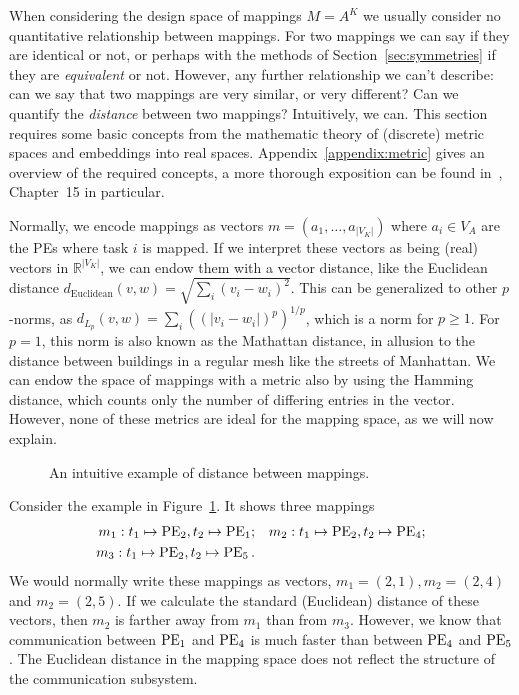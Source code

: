 When considering the design space of mappings $M = A^K$ we usually consider no quantitative relationship between mappings.
For two mappings we can say if they are identical or not, or perhaps with the methods of Section~\ref{sec:symmetries} if they are \emph{equivalent} or not.
However, any further relationship we can't describe: can we say that two mappings are very similar, or very different?
Can we quantify the \emph{distance} between two mappings?
Intuitively, we can.
This section requires some basic concepts from the mathematic theory of (discrete) metric spaces and embeddings into real spaces.
Appendix~\ref{appendix:metric} gives an overview of the required concepts, a more thorough exposition can be found in~\cite{matouvsek}, Chapter~15 in particular.

Normally, we encode mappings as vectors $m = \left( a_1, \ldots, a_{|V_K|} \right)$ where $a_i \in V_A$ are the \acp{PE} where task $i$ is mapped.
If we interpret these vectors as being (real) vectors in $\mathbb{R}^{|V_K|}$, we can endow them with a vector distance, like the Euclidean distance $d_\text{Euclidean}(v,w) = \sqrt{\sum_i (v_i - w_i)^2}$.
This can be generalized to other $p$-norms, as $d_{L_p}(v,w) = \sum_i ((|v_i-w_i|)^p)^{1/p}$, which is a norm for $p \geq 1$.
For $p = 1$, this norm is also known as the Mathattan distance, in allusion to the distance between buildings in a regular mesh like the streets of Manhattan.
We can endow the space of mappings with a metric also by using the Hamming distance, which counts only the number of differing entries in the vector.
However, none of these metrics are ideal for the mapping space, as we will now explain.

\begin{figure}[h]
	\centering
   \resizebox{0.85\textwidth}{!}{
	   \begin{tikzpicture}
	   
	   \end{tikzpicture}
	   }
	\caption{An intuitive example of distance between mappings.}
	\label{fig:intuition_metric}
\end{figure}

Consider the example in Figure~\ref{fig:intuition_metric}. 
It shows three mappings 
\begin{align*}
	m_1:  t_1 \mapsto \operatorname{PE}_2,  t_2 \mapsto \operatorname{PE}_1; & \quad m_2:  t_1 \mapsto \operatorname{PE}_2,  t_2 \mapsto \operatorname{PE}_4; \\ 
	m_3:  t_1 \mapsto \operatorname{PE}_2,  t_2 \mapsto \operatorname{PE}_5. \\ 
\end{align*}
We would normally write these mappings as vectors, $m_1 = \left( 2, 1 \right), m_2 = \left( 2, 4 \right)$ and $m_2 = \left( 2, 5 \right).$
If we calculate the standard (Euclidean) distance of these vectors, then $m_2$ is farther away from $m_1$ than from $m_3$.
However, we know that communication between $\operatorname{PE}_1$ and $\operatorname{PE}_4$ is much faster than between $\operatorname{PE}_4$ and $\operatorname{PE}_5$. 
The Euclidean distance in the mapping space does not reflect the structure of the communication subsystem.

